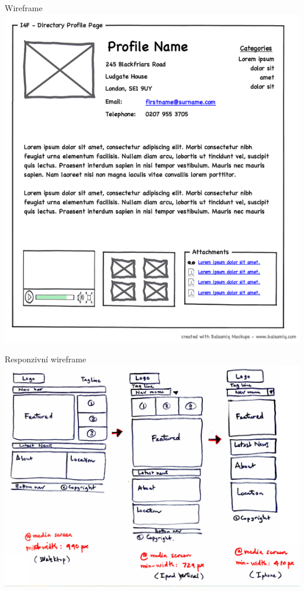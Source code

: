 \documentclass{beamer}
\begin{document}
\begin{frame}{Wireframe}
	  \includegraphics[width=\textwidth,height=\textheight,keepaspectratio]{wireframe}
\end{frame}

\begin{frame}{Responzivní wireframe}
	  \includegraphics[width=\columnwidth]{responsive-wireframe}
\end{frame}
\end{document}
